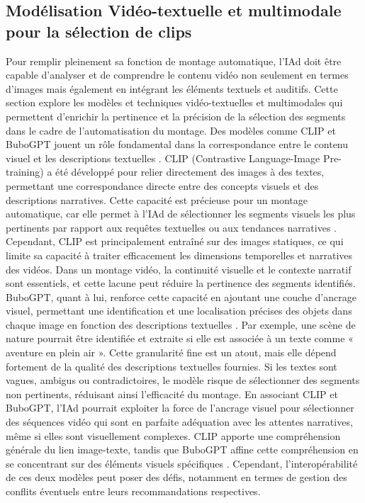 \documentclass[livre]{udes-genie-these}
\begin{document}
\subsection{Modélisation Vidéo-textuelle et multimodale pour la sélection de clips}
Pour remplir pleinement sa fonction de montage automatique, l'IAd doit être capable d'analyser et de comprendre le contenu vidéo non seulement en termes d'images mais également en intégrant les éléments textuels et auditifs. Cette section explore les modèles et techniques vidéo-textuelles et multimodales qui permettent d'enrichir la pertinence et la précision de la sélection des segments dans le cadre de l'automatisation du montage.
Des modèles comme CLIP et BuboGPT jouent un rôle fondamental dans la correspondance entre le contenu visuel et les descriptions textuelles \cite{bain2022}\cite{anonymous2023_bubogpt}. CLIP (Contrastive Language-Image Pre-training) a été développé pour relier directement des images à des textes, permettant une correspondance directe entre des concepts visuels et des descriptions narratives. Cette capacité est précieuse pour un montage automatique, car elle permet à l'IAd de sélectionner les segments visuels les plus pertinents par rapport aux requêtes textuelles ou aux tendances narratives \cite{chen2023}\cite{ghosh2019_excl}. Cependant, CLIP est principalement entraîné sur des images statiques, ce qui limite sa capacité à traiter efficacement les dimensions temporelles et narratives des vidéos. Dans un montage vidéo, la continuité visuelle et le contexte narratif sont essentiels, et cette lacune peut réduire la pertinence des segments identifiés.
BuboGPT, quant à lui, renforce cette capacité en ajoutant une couche d'ancrage visuel, permettant une identification et une localisation précises des objets dans chaque image en fonction des descriptions textuelles \cite{feng2023}\cite{munasinghe2023_pgvideo}. Par exemple, une scène de nature pourrait être identifiée et extraite si elle est associée à un texte comme « aventure en plein air ». Cette granularité fine est un atout, mais elle dépend fortement de la qualité des descriptions textuelles fournies. Si les textes sont vagues, ambigus ou contradictoires, le modèle risque de sélectionner des segments non pertinents, réduisant ainsi l'efficacité du montage.
En associant CLIP et BuboGPT, l'IAd pourrait exploiter la force de l'ancrage visuel pour sélectionner des séquences vidéo qui sont en parfaite adéquation avec les attentes narratives, même si elles sont visuellement complexes. CLIP apporte une compréhension générale du lien image-texte, tandis que BuboGPT affine cette compréhension en se concentrant sur des éléments visuels spécifiques \cite{chen2023}\cite{you2023_ferret}. Cependant, l'interopérabilité de ces deux modèles peut poser des défis, notamment en termes de gestion des conflits éventuels entre leurs recommandations respectives.
\end{document}
